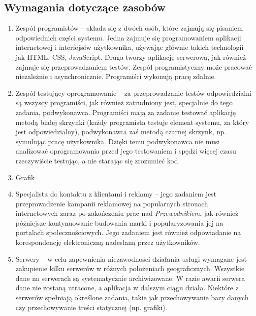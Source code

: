 \documentclass[12pt,a4paper]{report}
\begin{document}
\subsection{Wymagania dotyczące zasobów}
\begin{enumerate}
	\item Zespół programistów -- składa się z dwóch osób, które zajmują się pisaniem odpowiednich części systemu. Jedna zajmuje się programowaniem aplikacji internetowej i interfejsów użytkownika, używając głównie takich technologii jak HTML, CSS, JavaScript. Druga tworzy aplikację serwerową, jak również zajmuje się przeprowadzaniem testów. Zespół programistyczny może pracować niezależnie i asynchronicznie. Programiści wykonują pracę zdalnie. 
	\item Zespół testujący oprogramowanie -- za przeprowadzanie testów odpowiedzialni są wszyscy programiści, jak również zatrudniony jest, specjalnie do tego zadania, podwykonawca. Programiści mają za zadanie testować aplikację metodą białej skrzynki (każdy programista testuje element systemu, za który jest odpowiedzialny), podwykonawca zaś metodą czarnej skrzynk, np. symulując pracę użytkownika. Dzięki temu podwykonawca nie musi analizować oprogramowania przed jego testowaniem i spędzi więcej czasu rzeczywiście testując, a nie starając się zrozumieć kod.
	\item Grafik
	\item Specjalista do kontaktu z klientami i reklamy -- jego zadaniem jest przeprowadzenie kampanii reklamowej na popularnych stronach internetowych zaraz po zakończeniu prac nad \emph{Przewodnikiem}, jak również późniejsze kontynuowanie budowania marki i popularyzowania jej na portalach społecznościowych. Jego zadaniem jest również odpowiadanie na korespondencję elektroniczną nadesłaną przez użytkowników.
	\item Serwery -- w celu zapewnienia niezawodności działania usługi wymagane jest zakupienie kilku serwerów w różnych położeniach geograficznych. Wszystkie dane na serwerach są systematycznie archiwizowane. W razie awarii serwera dane nie zostaną utracone, a aplikacja w dalszym ciągu działa. Niektóre z serwerów spełniają określone zadania, takie jak przechowywanie bazy danych czy przechowywanie treści statycznej (np. grafiki). 
\end{enumerate}
\newpage
\end{document}

